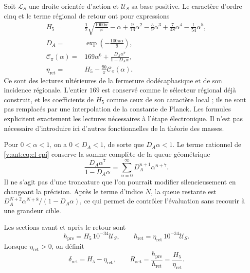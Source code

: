 Soit \(\mathcal L_S\) une droite orientée d'action et \(\mathcal U_S\)
sa base positive. Le caractère d'ordre cinq et le terme régional de
retour ont pour expressions
\begin{align}
 H_5={}&\frac12\sqrt{\frac{1000\alpha}{\varphi}}-\alpha
   +\frac9{16}\alpha^2-\frac59\alpha^3
   +\frac7{48}\alpha^4-\frac1{54}\alpha^5,
   \label{v:ant:eq:el-h5}\\
 D_A={}&\exp\!\left(-\frac{100\pi\alpha}{9}\right),
   \label{v:ant:eq:el-da}\\
 \mathcal C_\pi(\alpha)={}&169\alpha^6+
       \frac{D_A\alpha^7}{1-D_A\alpha},
   \label{v:ant:eq:el-cpi}\\
 \eta_{\mathrm{ret}}={}&H_5-\frac{90}{\pi}\mathcal C_\pi(\alpha).
   \label{v:ant:eq:el-eta}
\end{align}
Ce sont des lectures ultérieures de la fermeture dodécaphasique et de son
incidence régionale. L'entier \(169\) est conservé comme le sélecteur
régional déjà construit, et les coefficients de \(H_5\) comme ceux de son
caractère local ; ils ne sont pas remplacés par une interpolation de la constante de
Planck. Les formules explicitent exactement les lectures nécessaires
à l'étape électronique. Il n'est pas nécessaire d'introduire ici d'autres
fonctionnelles de la théorie des masses.

Pour \(0<\alpha<1\), on a \(0<D_A<1\), de sorte que
\(D_A\alpha<1\). Le terme rationnel de \eqref{v:ant:eq:el-cpi} conserve la
somme complète de la queue géométrique
\begin{equation}
 \frac{D_A\alpha^7}{1-D_A\alpha}
 =\sum_{n=0}^{\infty}D_A^{n+1}\alpha^{n+7}.
 \label{v:ant:eq:el-cola-regional}
\end{equation}
Il ne s'agit pas d'une troncature que l'on pourrait modifier silencieusement en changeant la
précision. Après le terme d'indice \(N\), la queue restante est
\(D_A^{N+2}\alpha^{N+8}/(1-D_A\alpha)\), ce qui permet de contrôler
l'évaluation sans recourir à une grandeur cible.

\begin{definition}
Les sections avant et après le retour sont
\begin{equation}
 \hbar_{\mathrm{pre}}=H_5\,10^{-34}\mathcal U_S,
 \qquad
 \hbar_{\mathrm{ret}}=\eta_{\mathrm{ret}}\,10^{-34}\mathcal U_S.
 \label{v:ant:eq:el-secciones-accion}
\end{equation}
Lorsque \(\eta_{\mathrm{ret}}>0\), on définit
\begin{equation}
 \delta_{\mathrm{ret}}=H_5-\eta_{\mathrm{ret}},\qquad
 R_{\mathrm{act}}=\frac{\hbar_{\mathrm{pre}}}{\hbar_{\mathrm{ret}}}
 =\frac{H_5}{\eta_{\mathrm{ret}}}.
 \label{v:ant:eq:el-ratio}
\end{equation}
\end{definition}

